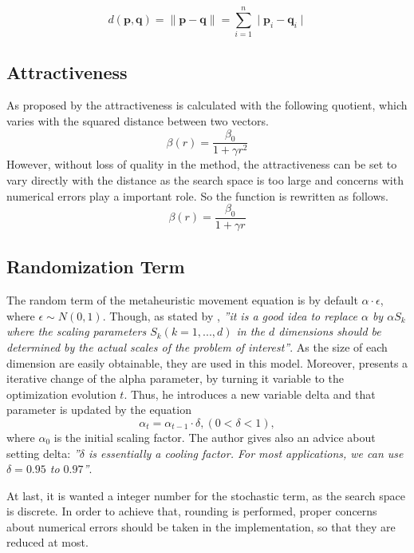 \documentclass[tuberlin,cic,tc,openright,english,noabntcite]{iiufrgs}
\begin{document}
$$d(\mathbf{p},\mathbf{q}) = \parallel \mathbf{p} - \mathbf{q} \parallel = \sum_{i=1}^{n} \mid \mathbf{p}_{i}-\mathbf{q}_{i} \mid$$

\subsection{Attractiveness}
As proposed by \autocite{Yang_2010} the attractiveness is calculated with the following quotient, which varies with the squared distance between two vectors.
$$\beta(r) = \frac{\beta_{0}}{1 + \gamma r^2}$$
However, without loss of quality in the method, the attractiveness can be set to vary directly with the distance as the search space is too large and concerns with numerical errors play a important role. So the function is rewritten as follows.
$$\beta(r) = \frac{\beta_{0}}{1 + \gamma r}$$

\subsection{Randomization Term}
The random term of the metaheuristic movement equation is by default $\alpha \cdot \epsilon$, where $\epsilon \sim N(0,1)$. Though, as stated by \autocite{Yang_2010}, \emph{”it is a good idea to replace $\alpha$ by $\alpha S_k$ where the scaling parameters $S_k (k=1,...,d)$ in the $d$ dimensions should be determined by the actual scales of the problem of interest”}. As the size of each dimension are easily obtainable, they are used in this model. Moreover, \autocite{Yang_2013} presents a iterative change of the alpha parameter, by turning it variable to the optimization evolution $t$. Thus, he introduces a new variable delta and that parameter is updated by the equation
$$ \alpha_t = \alpha_{t-1} \cdot \delta, (0 < \delta < 1),$$ where $\alpha_0$ is the initial scaling factor. The author gives also an advice about setting delta: \emph{”$\delta$ is essentially a cooling factor. For most applications, we can use $\delta = 0.95$ to $0.97$”}.

At last, it is wanted a integer number for the stochastic term, as the search space is discrete. In order to achieve that, rounding is performed, proper concerns about numerical errors should be taken in the implementation, so that they are reduced at most.
\end{document}

